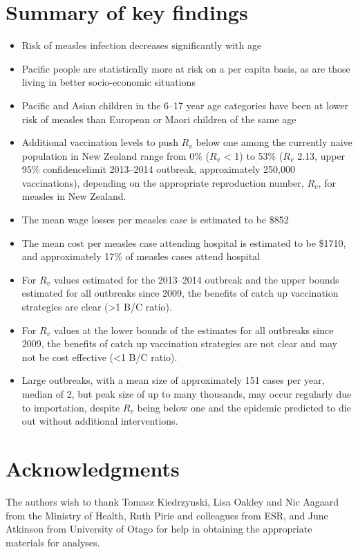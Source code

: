 \documentclass{article}
\begin{document}
\section {Summary of key findings}
\begin{itemize}
\item Risk of measles infection decreases significantly with age
\item Pacific people are statistically more at risk on a per capita basis, as are those living in better socio-economic situations
\item Pacific and Asian children in the 6--17 year age categories have been at lower risk of measles than European or Maori children of the same age
\item Additional vaccination levels to push $R_v$ below one among the currently naive population in New Zealand range from 0\% ($R_v$ < 1) to 53\% ($R_v$ 2.13, upper 95\% confidencelimit 2013--2014 outbreak, approximately 250,000 vaccinations), depending on the appropriate reproduction number, $R_v$, for measles in New Zealand.
\item The mean wage losses per measles case is estimated to be \$852
\item The mean cost per measles case attending hospital is estimated to be \$1710, and approximately 17\% of measles cases attend hospital
\item For $R_v$ values estimated for the 2013--2014 outbreak and the upper bounds estimated for all outbreaks since 2009, the benefits of catch up vaccination strategies are clear (>1 B/C ratio).
\item For $R_v$ values at the lower bounds of the estimates for all outbreaks since 2009, the benefits of catch up vaccination strategies are not clear and may not be cost effective (<1 B/C ratio).
\item Large outbreaks, with a mean size of approximately 151 cases per year, median of 2, but peak size of up to many thousands, may occur regularly due to importation, despite $R_v$ being below one and the epidemic predicted to die out without additional interventions.
\end{itemize}

\section{Acknowledgments}
The authors wish to thank Tomasz Kiedrzynski, Lisa Oakley and Nic Aagaard from the Ministry of Health, Ruth Pirie and colleagues from ESR, and June Atkinson from University of Otago for help in obtaining the appropriate materials for analyses.
\end{document}

